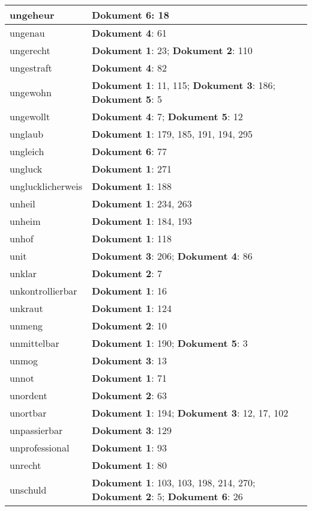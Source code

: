 \documentclass[a5paper]{article}
\begin{document}
\begin{longtable}[l]{|l|p{3in}|}
\hline
ungeheur & \textbf{Dokument 6}: 18 \\
\hline
ungenau & \textbf{Dokument 4}: 61 \\
\hline
ungerecht & \textbf{Dokument 1}: 23; \textbf{Dokument 2}: 110 \\
\hline
ungestraft & \textbf{Dokument 4}: 82 \\
\hline
ungewohn & \textbf{Dokument 1}: 11, 115; \textbf{Dokument 3}: 186; \textbf{Dokument 5}: 5 \\
\hline
ungewollt & \textbf{Dokument 4}: 7; \textbf{Dokument 5}: 12 \\
\hline
unglaub & \textbf{Dokument 1}: 179, 185, 191, 194, 295 \\
\hline
ungleich & \textbf{Dokument 6}: 77 \\
\hline
ungluck & \textbf{Dokument 1}: 271 \\
\hline
unglucklicherweis & \textbf{Dokument 1}: 188 \\
\hline
unheil & \textbf{Dokument 1}: 234, 263 \\
\hline
unheim & \textbf{Dokument 1}: 184, 193 \\
\hline
unhof & \textbf{Dokument 1}: 118 \\
\hline
unit & \textbf{Dokument 3}: 206; \textbf{Dokument 4}: 86 \\
\hline
unklar & \textbf{Dokument 2}: 7 \\
\hline
unkontrollierbar & \textbf{Dokument 1}: 16 \\
\hline
unkraut & \textbf{Dokument 1}: 124 \\
\hline
unmeng & \textbf{Dokument 2}: 10 \\
\hline
unmittelbar & \textbf{Dokument 1}: 190; \textbf{Dokument 5}: 3 \\
\hline
unmog & \textbf{Dokument 3}: 13 \\
\hline
unnot & \textbf{Dokument 1}: 71 \\
\hline
unordent & \textbf{Dokument 2}: 63 \\
\hline
unortbar & \textbf{Dokument 1}: 194; \textbf{Dokument 3}: 12, 17, 102 \\
\hline
unpassierbar & \textbf{Dokument 3}: 129 \\
\hline
unprofessional & \textbf{Dokument 1}: 93 \\
\hline
unrecht & \textbf{Dokument 1}: 80 \\
\hline
unschuld & \textbf{Dokument 1}: 103, 103, 198, 214, 270; \textbf{Dokument 2}: 5; \textbf{Dokument 6}: 26 \\

\end{longtable}
\end{document}
